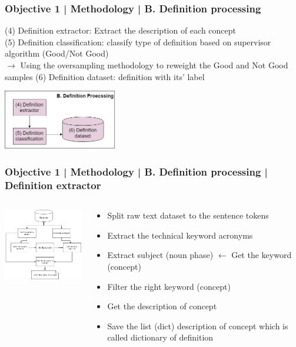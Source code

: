 \documentclass{beamer}
\begin{document}
\begin{frame}
\frametitle{Objective 1 | Methodology | B. Definition processing}
(4) Definition extractor: Extract the description of each concept\\
(5) Definition classification: classify type of definition based on supervisor algorithm (Good/Not Good)\\
$\rightarrow$ Using the oversampling methodology to reweight the Good and Not Good samples
(6) Definition dataset: definition with its' label
\begin{center}
		\includegraphics[width=50mm]{df2.png}
\end{center}
\end{frame}
\begin{frame}
\frametitle{Objective 1 | Methodology | B. Definition processing | Definition extractor}
\begin{columns}
		\begin{column}{.5\textwidth}
		\includegraphics[width=50mm]{df1.png}
	\end{column}
	\begin{column}{.65\textwidth}
		
		\begin{itemize}
			\item Split raw text dataset to the sentence tokens
			\item Extract the technical keyword acronyms
			\item Extract subject (noun phase) $\leftarrow$ Get the keyword (concept)
			\item Filter the right keyword (concept)
			\item Get the description of concept
			\item Save the list (dict) description of concept which is called dictionary of definition
		\end{itemize}
	\end{column}

	
\end{columns}
\end{frame}
\end{document}
